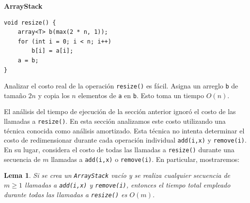 \documentclass[11pt]{book}
\theoremstyle{plain}
\newtheorem{lema}{Lema}[chapter]
\newcommand{\claseheader}[1]{\noindent\textbf{#1}\par\vspace{-4pt}}
\begin{document}
\claseheader{ArrayStack}
\begin{lstlisting}
void resize() {
    array<T> b(max(2 * n, 1));
    for (int i = 0; i < n; i++)
        b[i] = a[i];
    a = b;
}
\end{lstlisting}

Analizar el costo real de la operación \texttt{resize()} es fácil. Asigna un arreglo \texttt{b} de tamaño $2n$ y copia los $n$ elementos de \texttt{a} en \texttt{b}. Esto toma un tiempo $O(n)$.

El análisis del tiempo de ejecución de la sección anterior ignoró el costo de las llamadas a \texttt{resize()}. En esta sección analizamos este costo utilizando una técnica conocida como análisis amortizado. Esta técnica no intenta determinar el costo de redimensionar durante cada operación individual \texttt{add(i,x)} y \texttt{remove(i)}. En su lugar, considera el costo de todas las llamadas a \texttt{resize()} durante una secuencia de $m$ llamadas a \texttt{add(i,x)} o \texttt{remove(i)}. En particular, mostraremos:

\begin{lema}
Si se crea un \texttt{ArrayStack} vacío y se realiza cualquier secuencia de $m \ge 1$ llamadas a \texttt{add(i,x)} y \texttt{remove(i)}, entonces el tiempo total empleado durante todas las llamadas a \texttt{resize()} es $O(m)$.
\end{lema}
\end{document}
